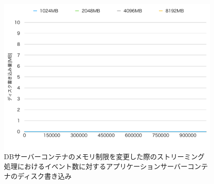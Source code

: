 \documentclass[../../../../../main]{subfiles}
\begin{document}
    \begin{figure}[H]
        \centering
        \includegraphics[width=12cm]{graph}
        \caption{DBサーバーコンテナのメモリ制限を変更した際のストリーミング処理におけるイベント数に対するアプリケーションサーバーコンテナのディスク書き込み}
        \label{fig:stream-change-db-memory-limit-app-disk-in-app_4_8192-db_400}
    \end{figure}
\end{document}
